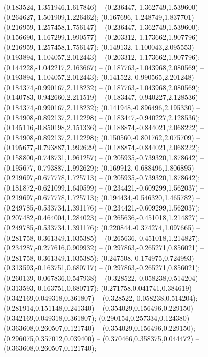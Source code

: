  (0.183524,-1.351946,1.617846) -- (0.236447,-1.362749,1.539600) -- (0.264627,-1.501909,1.226462);
 (0.167696,-1.248749,1.837701) -- (0.216959,-1.257458,1.756147) -- (0.236447,-1.362749,1.539600);
 (0.156690,-1.167299,1.990577) -- (0.203312,-1.173662,1.907796) -- (0.216959,-1.257458,1.756147);
 (0.149132,-1.100043,2.095553) -- (0.193894,-1.104057,2.012443) -- (0.203312,-1.173662,1.907796);
 (0.144228,-1.042217,2.163667) -- (0.187763,-1.043968,2.080569) -- (0.193894,-1.104057,2.012443);
 (0.141522,-0.990565,2.201248) -- (0.184374,-0.990167,2.118232) -- (0.187763,-1.043968,2.080569);
 (0.140783,-0.942660,2.211519) -- (0.183447,-0.940227,2.128536) -- (0.184374,-0.990167,2.118232);
 (0.141948,-0.896496,2.195330) -- (0.184908,-0.892137,2.112298) -- (0.183447,-0.940227,2.128536);
 (0.145116,-0.850198,2.151336) -- (0.188874,-0.844021,2.068222) -- (0.184908,-0.892137,2.112298);
 (0.150560,-0.801762,2.075709) -- (0.195677,-0.793887,1.992629) -- (0.188874,-0.844021,2.068222);
 (0.158800,-0.748731,1.961257) -- (0.205935,-0.739320,1.878642) -- (0.195677,-0.793887,1.992629);
 (0.169912,-0.688496,1.806895) -- (0.219697,-0.677778,1.725713) -- (0.205935,-0.739320,1.878642);
 (0.181872,-0.621099,1.640599) -- (0.234421,-0.609299,1.562037) -- (0.219697,-0.677778,1.725713);
 (0.194434,-0.546320,1.465782) -- (0.249785,-0.533734,1.391176) -- (0.234421,-0.609299,1.562037);
 (0.207482,-0.464004,1.284023) -- (0.265636,-0.451018,1.214827) -- (0.249785,-0.533734,1.391176);
 (0.220844,-0.374274,1.097665) -- (0.281758,-0.361349,1.035385) -- (0.265636,-0.451018,1.214827);
 (0.234287,-0.277616,0.909932) -- (0.297863,-0.265271,0.856021) -- (0.281758,-0.361349,1.035385);
 (0.247508,-0.174975,0.724993) -- (0.313593,-0.163751,0.680717) -- (0.297863,-0.265271,0.856021);
 (0.260139,-0.067836,0.547938) -- (0.328522,-0.058238,0.514204) -- (0.313593,-0.163751,0.680717);
 (0.271758,0.041741,0.384619) -- (0.342169,0.049318,0.361807) -- (0.328522,-0.058238,0.514204);
 (0.281914,0.151148,0.241340) -- (0.354029,0.156496,0.229150) -- (0.342169,0.049318,0.361807);
 (0.290154,0.257334,0.124380) -- (0.363608,0.260507,0.121740) -- (0.354029,0.156496,0.229150);
 (0.296075,0.357012,0.039400) -- (0.370466,0.358375,0.044472) -- (0.363608,0.260507,0.121740);
